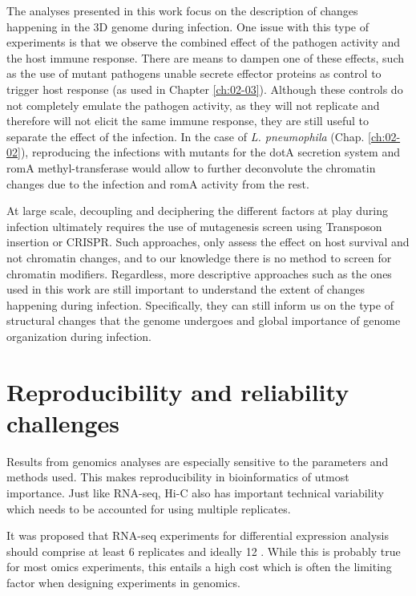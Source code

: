 The analyses presented in this work focus on the description of changes happening in the 3D genome during infection. One issue with this type of experiments is that we observe the combined effect of the pathogen activity and the host immune response. There are means to dampen one of these effects, such as the use of mutant pathogens unable secrete effector proteins as control to trigger host response (as used in Chapter \ref{ch:02-03}). Although these controls do not completely emulate the pathogen activity, as they will not replicate  \cite{vogelConjugativeTransferVirulence1998} and therefore will not elicit the same immune response, they are still useful to separate the effect of the infection. In the case of \textit{L. pneumophila} (Chap. \ref{ch:02-02}), reproducing the infections with mutants for the dotA secretion system and romA methyl-transferase would allow to further deconvolute the chromatin changes due to the infection and romA activity from the rest.

At large scale, decoupling and deciphering the different factors at play during infection ultimately requires the use of mutagenesis screen using Transposon insertion or CRISPR. Such approaches, only assess the effect on host survival and not chromatin changes, and to our knowledge there is no method to screen for chromatin modifiers. Regardless, more descriptive approaches such as the ones used in this work are still important to understand the extent of changes happening during infection. Specifically, they can still inform us on the type of structural changes that the genome undergoes and global importance of genome organization during infection.


\section{Reproducibility and reliability challenges}

Results from genomics analyses are especially sensitive to the parameters and methods used. This makes reproducibility in bioinformatics of utmost importance. Just like RNA-seq, Hi-C also has important technical variability which needs to be accounted for using multiple replicates.

It was proposed that RNA-seq experiments for differential expression analysis should comprise at least 6 replicates and ideally 12 \cite{schurchHowManyBiological2016}. While this is probably true for most omics experiments, this entails a high cost which is often the limiting factor when designing experiments in genomics.

